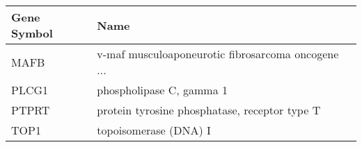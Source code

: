 \begin{tabular}{ll}
\toprule
Gene Symbol &                                               Name \\
\midrule
       MAFB & v-maf musculoaponeurotic fibrosarcoma oncogene ... \\
      PLCG1 &                           phospholipase C, gamma 1 \\
      PTPRT &      protein tyrosine phosphatase, receptor type T \\
       TOP1 &                              topoisomerase (DNA) I \\
\bottomrule
\end{tabular}
